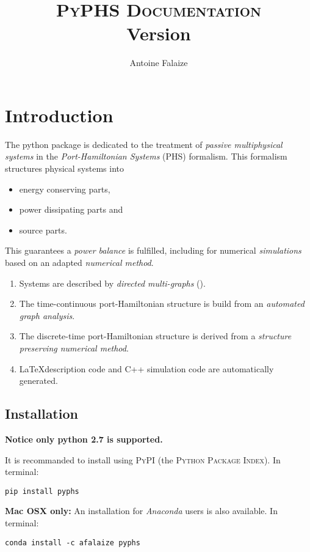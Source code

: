 \documentclass[10pt,a4paper]{article}
\author{Antoine Falaize}
\title{\textsc{PyPHS Documentation}\\ Version \version}
\begin{document}
%
\maketitle
%
\section{Introduction}
%
The python package  is dedicated to the treatment of \emph{passive multiphysical systems} in the \emph{Port-Hamiltonian Systems} (PHS) formalism. This formalism structures physical systems into 
%
\begin{itemize}
\item energy conserving parts, 
\item power dissipating parts and 
\item source parts.
\end{itemize}
%

This guarantees a \emph{power balance} is fulfilled, including for numerical \emph{simulations} based on an adapted \emph{numerical method}.   
%

\begin{enumerate}
\item Systems are described by \emph{directed multi-graphs} ().
\item The time-continuous port-Hamiltonian structure is build from an \emph{automated graph analysis}.
\item The discrete-time port-Hamiltonian structure is derived from a \emph{structure preserving numerical method}.
\item \LaTeX description code and \textsc{C++} simulation code are automatically generated.
\end{enumerate}
\subsection{Installation}
%
\begin{center}
\textbf{Notice only python 2.7 is supported.}
\end{center}
%
It is recommanded to install  using \textsc{PyPI} (the \textsc{Python Package Index}). In terminal:
%
\begin{verbatim}
pip install pyphs
\end{verbatim}
%
\textbf{Mac OSX only:} An installation for \emph{Anaconda} users is also available. In terminal:
%
\begin{verbatim}
conda install -c afalaize pyphs
\end{verbatim}
%
\end{document}
